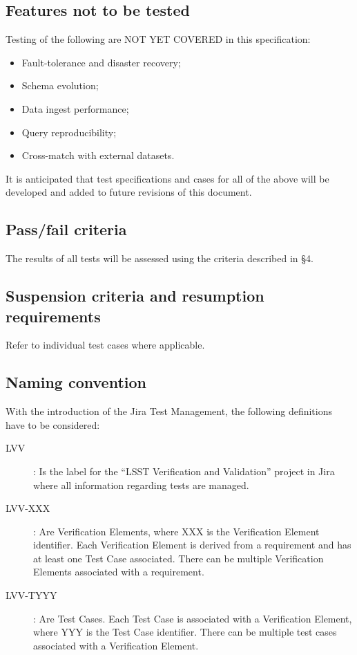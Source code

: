 \documentclass[DM,lsstdraft,STS,toc]{lsstdoc}
\begin{document}
\subsection{Features not to be tested}
\label{sec:featnot2test}

Testing of the following are NOT YET COVERED in this specification:

\begin{itemize}
  \item{Fault-tolerance and disaster recovery;}
  \item{Schema evolution;}
  \item{Data ingest performance;}
  \item{Query reproducibility;}
  \item{Cross-match with external datasets.}
\end{itemize}

It is anticipated that test specifications and cases for all of the above will be developed
and added to future revisions of this document.

\subsection{Pass/fail criteria}
\label{sec:passfail}

The results of all tests will be assessed using the criteria described in  \S4.

\subsection{Suspension criteria and resumption requirements}
\label{suspension}

Refer to individual test cases where applicable.

\subsection{Naming convention}

With the introduction of the Jira Test Management, the following definitions have to be considered:

\begin{description}
  \item[LVV]{: Is the label for the ``LSST \gls{Verification} and \gls{Validation}'' project in Jira where all information regarding tests are managed.}
  \item[LVV-XXX]{: Are \gls{Verification} Elements, where XXX is the \gls{Verification} Element identifier.  Each \gls{Verification} Element is derived from a requirement and has at least one Test Case associated. There can be multiple \gls{Verification} Elements associated with a requirement.}
  \item[LVV-TYYY]{: Are Test Cases. Each Test Case is associated with a \gls{Verification} Element, where YYY is the Test Case identifier. There can be multiple test cases associated with a \gls{Verification} Element.}
\end{description}
\end{document}
